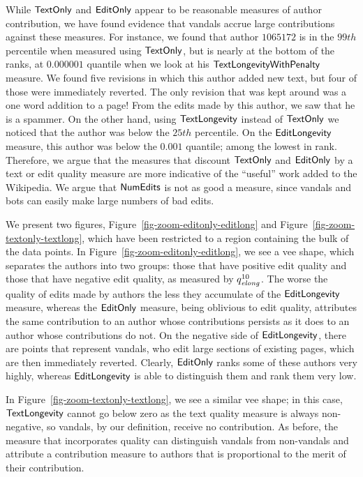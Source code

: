 While $\mathsf{TextOnly}$ and $\mathsf{EditOnly}$ appear to be reasonable measures 
of author contribution, we have found evidence that vandals
accrue large contributions against these measures.
For instance, we found that author $1065172$ is in the $99th$ 
percentile when measured using $\mathsf{TextOnly}$, but is nearly at the
bottom of the ranks, at $0.000001$ quantile when we look at his
$\mathsf{TextLongevityWithPenalty}$ measure.
We found five revisions in which this author added new text, but
four of those were immediately reverted.
The only revision that was kept around was a one word addition to a
page!
From the edits made by this author, we saw that he is a spammer.
On the other hand, using $\mathsf{TextLongevity}$ instead of $\mathsf{TextOnly}$ we
noticed that the author was below the $25th$ percentile.
On the $\mathsf{EditLongevity}$ measure, this author was below the 
$0.001$ quantile; among the lowest in rank.
Therefore, we argue that the measures that discount $\mathsf{TextOnly}$ and 
$\mathsf{EditOnly}$ by a text or edit quality measure are more indicative
of the ``useful'' work added to the Wikipedia.
We argue that $\mathsf{NumEdits}$ is not as good a measure, since 
vandals and bots can easily make large numbers of bad edits.

We present two figures, Figure~\ref{fig-zoom-editonly-editlong}
and Figure~\ref{fig-zoom-textonly-textlong},
which have been restricted to a region containing the
bulk of the data points.
In Figure~\ref{fig-zoom-editonly-editlong},
we see a vee shape, which separates the authors into
two groups: those that have positive edit quality and those
that have negative edit quality, as measured by $\quality{elong}{10}{}$.
The worse the quality of edits made by authors the less they
accumulate of the $\mathsf{EditLongevity}$ measure, whereas the $\mathsf{EditOnly}$
measure, being oblivious to edit quality, attributes the same
contribution to an author whose contributions persists as it 
does to an author whose contributions do not.
On the negative side of $\mathsf{EditLongevity}$, there are points that represent
vandals, who edit large sections of existing pages, which are
then immediately reverted.
Clearly, $\mathsf{EditOnly}$ ranks some of these authors very highly,
whereas $\mathsf{EditLongevity}$ is able to distinguish them and rank
them very low.

In Figure~\ref{fig-zoom-textonly-textlong},
we see a similar vee shape; in this case, $\mathsf{TextLongevity}$
cannot go below zero as the text quality measure is always 
non-negative, so vandals, by our definition, receive no 
contribution.
As before, the measure that incorporates quality can 
distinguish vandals from non-vandals and attribute a contribution
measure to authors that is proportional to the merit of their
contribution.

